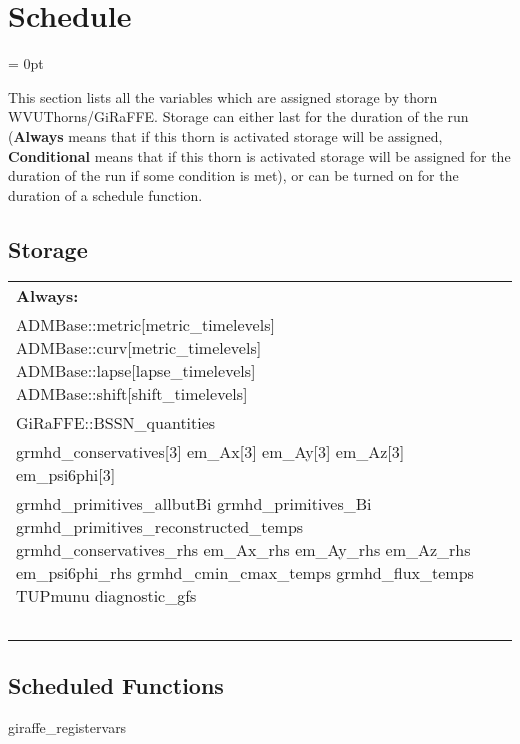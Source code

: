 
\section{Schedule} 


\parskip = 0pt


\noindent This section lists all the variables which are assigned storage by thorn WVUThorns/GiRaFFE.  Storage can either last for the duration of the run ({\bf Always} means that if this thorn is activated storage will be assigned, {\bf Conditional} means that if this thorn is activated storage will be assigned for the duration of the run if some condition is met), or can be turned on for the duration of a schedule function.


\subsection*{Storage}

\hspace{5mm}

 \begin{tabular*}{160mm}{ll} 

{\bf Always:}&  ~ \\ 
 ADMBase::metric[metric\_timelevels] ADMBase::curv[metric\_timelevels] ADMBase::lapse[lapse\_timelevels] ADMBase::shift[shift\_timelevels] & ~\\ 
 GiRaFFE::BSSN\_quantities & ~\\ 
 grmhd\_conservatives[3] em\_Ax[3] em\_Ay[3] em\_Az[3] em\_psi6phi[3] & ~\\ 
 grmhd\_primitives\_allbutBi grmhd\_primitives\_Bi grmhd\_primitives\_reconstructed\_temps grmhd\_conservatives\_rhs em\_Ax\_rhs em\_Ay\_rhs em\_Az\_rhs em\_psi6phi\_rhs grmhd\_cmin\_cmax\_temps grmhd\_flux\_temps TUPmunu diagnostic\_gfs & ~\\ 
~ & ~\\ 
\end{tabular*} 


\subsection*{Scheduled Functions}
\vspace{5mm}


\hspace{5mm} giraffe\_registervars 

\hspace{5mm}{\it register evolved, rhs variables in giraffe for mol } 


